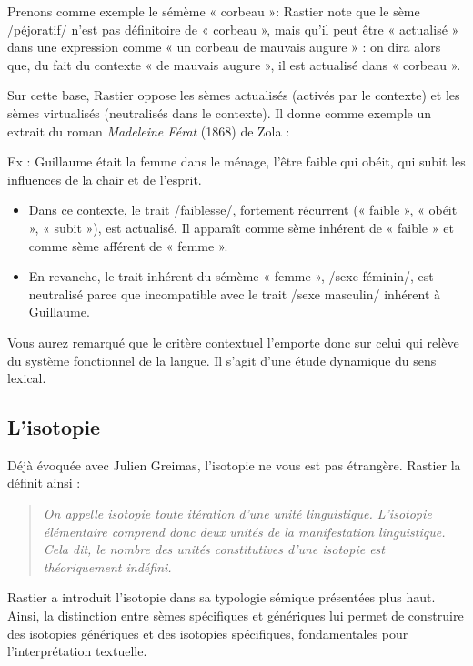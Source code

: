 Prenons comme exemple le sémème « corbeau »: Rastier note que le sème /péjoratif/ n’est pas définitoire de « corbeau », mais qu’il peut être « actualisé » dans une expression comme « un corbeau de mauvais augure » : on dira alors que, du fait du contexte « de mauvais augure », il est actualisé dans « corbeau ».

Sur cette base, Rastier oppose les sèmes actualisés (activés par le contexte) et les sèmes virtualisés (neutralisés dans le contexte). Il donne comme exemple un extrait du roman \textit{Madeleine Férat} (1868) de Zola :

Ex : Guillaume était la femme dans le ménage, l’être faible qui obéit, qui subit les influences de la chair et de l’esprit.
\begin{itemize}
\item Dans ce contexte, le trait /faiblesse/, fortement récurrent (« faible », « obéit », « subit »), est actualisé. Il apparaît comme sème inhérent de « faible » et comme sème afférent de « femme ».
\item En revanche, le trait inhérent du sémème « femme », /sexe féminin/, est neutralisé parce que incompatible avec le trait /sexe masculin/ inhérent à Guillaume.
\end{itemize}
Vous aurez remarqué que le critère contextuel l’emporte donc sur celui qui relève du système fonctionnel de la langue. Il s’agit d’une étude dynamique du sens lexical.

\subsection{L’isotopie}
Déjà évoquée avec Julien Greimas, l’isotopie ne vous est pas étrangère. Rastier la définit ainsi :
\begin{quote}\small\itshape
On appelle isotopie toute itération d’une unité linguistique. L’isotopie élémentaire comprend donc deux unités de la manifestation linguistique. Cela dit, le nombre des unités constitutives d’une isotopie est théoriquement indéfini.
\end{quote}

Rastier a introduit l’isotopie dans sa typologie sémique présentées plus haut. Ainsi, la distinction entre sèmes spécifiques et génériques lui permet de construire des isotopies génériques et des isotopies spécifiques, fondamentales pour l’interprétation textuelle.

